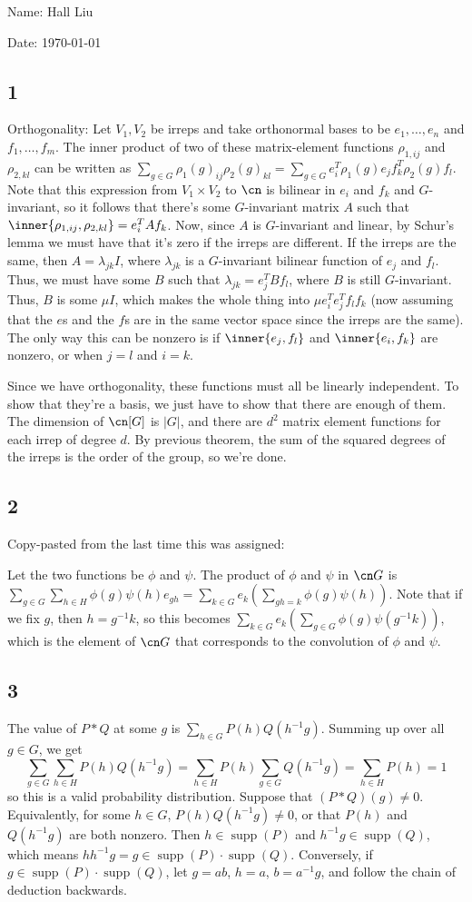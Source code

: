 \documentclass{article}
\DeclareMathOperator{\supp}{supp}
\begin{document}
Name: Hall Liu

Date: \today 
\vspace{1.5cm}
\subsection*{1}
Orthogonality: Let $V_1,V_2$ be irreps and take orthonormal bases to be $e_1,\ldots,e_n$ and $f_1,\ldots,f_m$. The inner product of two of these matrix-element functions $\rho_{1,ij}$ and $\rho_{2,kl}$ can be written as $\sum_{g\in G}\rho_1(g)_{ij}\rho_2(g)_{kl}=\sum_{g\in G}e_i^T\rho_1(g)e_jf_k^T\rho_2(g)f_l$. Note that this expression from $V_1\times V_2$ to $\cn$ is bilinear in $e_i$ and $f_k$ and $G$-invariant, so it follows that there's some $G$-invariant matrix $A$ such that $\inner{\rho_{1,ij},\rho_{2,kl}}=e_i^TAf_k$. Now, since $A$ is $G$-invariant and linear, by Schur's lemma we must have that it's zero if the irreps are different. If the irreps are the same, then $A=\lambda_{jk}I$, where $\lambda_{jk}$ is a $G$-invariant bilinear function of $e_j$ and $f_l$. Thus, we must have some $B$ such that $\lambda_{jk}=e_j^TBf_l$, where $B$ is still $G$-invariant. Thus, $B$ is some $\mu I$, which makes the whole thing into $\mu e_i^Te_j^Tf_lf_k$ (now assuming that the $e$s and the $f$s are in the same vector space since the irreps are the same). The only way this can be nonzero is if $\inner{e_j,f_l}$ and $\inner{e_i,f_k}$ are nonzero, or when $j=l$ and $i=k$. 

Since we have orthogonality, these functions must all be linearly independent. To show that they're a basis, we just have to show that there are enough of them. The dimension of $\cn[G]$ is $|G|$, and there are $d^2$ matrix element functions for each irrep of degree $d$. By previous theorem, the sum of the squared degrees of the irreps is the order of the group, so we're done.
\subsection*{2}
Copy-pasted from the last time this was assigned:

Let the two functions be $\phi$ and $\psi$. The product of $\phi$ and $\psi$ in $\cn G$ is $\sum_{g\in G}\sum_{h\in H}\phi(g)\psi(h)e_{gh}=\sum_{k\in G}e_k\left(\sum_{gh=k}\phi(g)\psi(h)\right)$. Note that if we fix $g$, then $h=g^{-1}k$, so this becomes $\sum_{k\in G}e_k\left(\sum_{g\in G}\phi(g)\psi(g^{-1}k)\right)$, which is the element of $\cn G$ that corresponds to the convolution of $\phi$ and $\psi$.
\subsection*{3}
The value of $P*Q$ at some $g$ is $\sum_{h\in G}P(h)Q(h^{-1}g)$. Summing up over all $g\in G$, we get
\[\sum_{g\in G}\sum_{h\in H}P(h)Q(h^{-1}g)=\sum_{h\in H}P(h)\sum_{g\in G}Q(h^{-1}g)=\sum_{h\in H}P(h)=1\]
so this is a valid probability distribution.
Suppose that $(P*Q)(g)\neq0$. Equivalently, for some $h\in G$, $P(h)Q(h^{-1}g)\neq0$, or that $P(h)$ and $Q(h^{-1}g)$ are both nonzero. Then $h\in\supp(P)$ and $h^{-1}g\in\supp(Q)$, which means $hh^{-1}g=g\in\supp(P)\cdot\supp(Q)$. Conversely, if $g\in\supp(P)\cdot\supp(Q)$, let $g=ab$, $h=a$, $b=a^{-1}g$, and follow the chain of deduction backwards.
\end{document}
